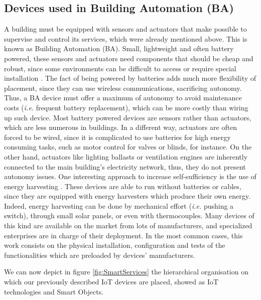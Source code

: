 \subsection{Devices used in Building Automation (BA)}
\label{subsec:Devices4BA}
A building must be equipped with sensors and actuators that make possible to supervise and control its services, which were already mentioned above.
This is known as Building Automation (BA).
Small, lightweight and often battery powered, these sensors and actuators need components that should be cheap and robust, since some environments can be difficult to access or require special installation \cite{younis2008placement}.
The fact of being powered by batteries adds much more flexibility of placement, since they can use wireless communications, sacrificing autonomy.
Thus, a BA device must offer a maximum of autonomy to avoid maintenance costs (\textit{i.e.} frequent battery replacement), which can be more costly than wiring up such device.
Most battery powered devices are sensors rather than actuators, which are less numerous in buildings.
In a different way, actuators are often forced to be wired, since it is complicated to use batteries for high energy consuming tasks, such as motor control for valves or blinds, for instance.
On the other hand, actuators like lighting ballasts or ventilation engines are inherently connected to the main building's electricity network, thus, they do not present autonomy issues.
One interesting approach to increase self-sufficiency is the use of energy harvesting \cite{grassl2006energy}.
These devices are able to run without batteries or cables, since they are equipped with energy harvesters which produce their own energy.
Indeed, energy harvesting can be done by mechanical effort (\textit{i.e.} pushing a switch), through small solar panels, or even with thermocouples.
Many devices of this kind are available on the market from lots of manufacturers, and specialized enterprises are in charge of their deployment.
In the most common cases, this work consists on the physical installation, configuration and tests of the functionalities which are preloaded by devices' manufacturers.

We can now depict in figure \ref{fig:SmartServices} the hierarchical organisation on which our previously described IoT devices are placed, showed as IoT technologies and Smart Objects.

